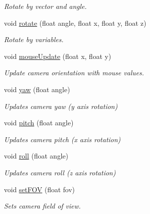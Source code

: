\begin{DoxyCompactItemize}
\begin{DoxyCompactList}\small\item\em Rotate by vector and angle. \end{DoxyCompactList}\item 
\hypertarget{class_camera_a4a45040f06f24a53af7f17bbcc610f22}{void \hyperlink{class_camera_a4a45040f06f24a53af7f17bbcc610f22}{rotate} (float angle, float x, float y, float z)}\label{class_camera_a4a45040f06f24a53af7f17bbcc610f22}

\begin{DoxyCompactList}\small\item\em Rotate by variables. \end{DoxyCompactList}\item 
\hypertarget{class_camera_a6d9db1d2cb3323a40be2d6ac1eea1763}{void \hyperlink{class_camera_a6d9db1d2cb3323a40be2d6ac1eea1763}{mouse\+Update} (float x, float y)}\label{class_camera_a6d9db1d2cb3323a40be2d6ac1eea1763}

\begin{DoxyCompactList}\small\item\em Update camera orientation with mouse values. \end{DoxyCompactList}\item 
\hypertarget{class_camera_ab4eab94754431725c572d528a07a35cc}{void \hyperlink{class_camera_ab4eab94754431725c572d528a07a35cc}{yaw} (float angle)}\label{class_camera_ab4eab94754431725c572d528a07a35cc}

\begin{DoxyCompactList}\small\item\em Updates camera yaw (y axis rotation) \end{DoxyCompactList}\item 
\hypertarget{class_camera_a49e00b90b94853e4485a6bdf063796de}{void \hyperlink{class_camera_a49e00b90b94853e4485a6bdf063796de}{pitch} (float angle)}\label{class_camera_a49e00b90b94853e4485a6bdf063796de}

\begin{DoxyCompactList}\small\item\em Updates camera pitch (x axis rotation) \end{DoxyCompactList}\item 
\hypertarget{class_camera_a72be99f88b1cc21122178109d3441818}{void \hyperlink{class_camera_a72be99f88b1cc21122178109d3441818}{roll} (float angle)}\label{class_camera_a72be99f88b1cc21122178109d3441818}

\begin{DoxyCompactList}\small\item\em Updates camera roll (z axis rotation) \end{DoxyCompactList}\item 
\hypertarget{class_camera_ade53ee61895c2143da3cec03d08ef3eb}{void \hyperlink{class_camera_ade53ee61895c2143da3cec03d08ef3eb}{set\+F\+O\+V} (float fov)}\label{class_camera_ade53ee61895c2143da3cec03d08ef3eb}

\begin{DoxyCompactList}\small\item\em Sets camera field of view. \end{DoxyCompactList}\end{DoxyCompactItemize}
